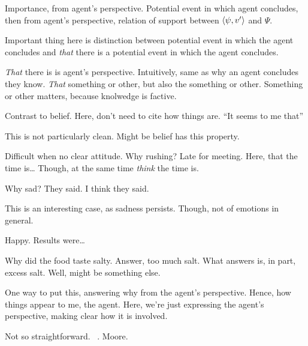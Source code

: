 \begin{note}[Distinction]
  Importance, \qWhy{} from agent's perspective.
  Potential event in which agent concludes, then from agent's perspective, relation of support between \(\langle \psi, v' \rangle\) and \(\Psi\).

  Important thing here is distinction between potential event in which the agent concludes and \emph{that} there is a potential event in which the agent concludes.

  \emph{That} there is is agent's perspective.
  Intuitively, same as why an agent concludes they know.
  \emph{That} something or other, but also the something or other.
  Something or other matters, because knolwedge is factive.

  Contrast to belief.
  Here, don't need to cite how things are.
  ``It seems to me that''

  This is not particularly clean.
  Might be belief has this property.

  Difficult when no clear attitude.
  Why rushing?
  Late for meeting.
  Here, that the time is\dots
  Though, at the same time \emph{think} the time is.

  Why sad?
  They said.
  I think they said.

  This is an interesting case, as sadness persists.
  Though, not of emotions in general.

  Happy.
  Results were\dots

  Why did the food taste salty.
  Answer, too much salt.
  What answers is, in part, excess salt.
  Well, might be something else.

  One way to put this, answering why from the agent's perspective.
  Hence, how things appear to me, the agent.
  Here, we're just expressing the agent's perspective, making clear how it is involved.

  Not so straightforward.
  ~\cite{Collins:1997wn}.
  Moore.


\end{note}
